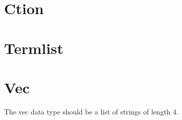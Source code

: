 \documentclass{article}
\begin{document}
\section{Ction}

\section{Termlist}


\section{Vec}
The vec data type should be a list of strings of length 4. 
\end{document}
